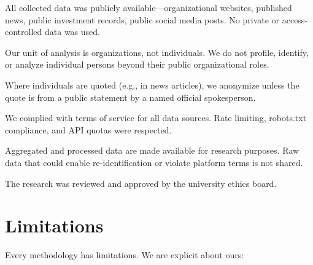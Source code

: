 \documentclass[../main.tex]{subfiles}
\begin{document}
\begin{description}[leftmargin=0.5cm, itemsep=0.3em]
\item[Public data] All collected data was publicly available---organizational websites, published news, public investment records, public social media posts. No private or access-controlled data was used.

\item[Organizational focus] Our unit of analysis is organizations, not individuals. We do not profile, identify, or analyze individual persons beyond their public organizational roles.

\item[Anonymization] Where individuals are quoted (e.g., in news articles), we anonymize unless the quote is from a public statement by a named official spokesperson.

\item[Platform compliance] We complied with terms of service for all data sources. Rate limiting, robots.txt compliance, and API quotas were respected.

\item[Data sharing] Aggregated and processed data are made available for research purposes. Raw data that could enable re-identification or violate platform terms is not shared.
\end{description}

The research was reviewed and approved by the university ethics board.


\section{Limitations}

Every methodology has limitations. We are explicit about ours:
\end{document}
